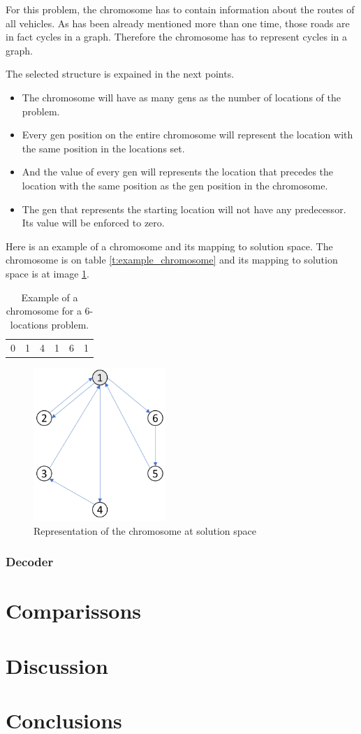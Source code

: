 \documentclass[]{report}
\begin{document}
For this problem, the chromosome has to contain information about the routes of all vehicles. As has been already mentioned more than one time, those roads are in fact cycles in a graph. Therefore the chromosome has to represent cycles in a graph. 

The selected structure is expained in the next points.
\begin{itemize}
	\item The chromosome will have as many gens as the number of locations of the problem.
	\item Every gen position on the entire chromosome will represent the location with the same position in the locations set.
	\item And the value of every gen will represents the location that precedes the location with the same position as the gen position in the chromosome.
	\item The gen that represents the starting location will not have any predecessor. Its value will be enforced to zero.
\end{itemize}

Here is an example of a chromosome and its mapping to solution space. The chromosome is on table \ref{t:example_chromosome} and its mapping to solution space is at image \ref{img:chromosome_representation}.

\begin{table}[H]
	\centering
	\caption{Example of a chromosome for a 6-locations problem.}
	\label{t:example_chromosome}
	\label{my-label}
	\begin{tabular}{@{}| c | c | c | c | c | c |@{}}
		0 & 1 & 4 & 1 & 6 & 1 \\
	\end{tabular}
\end{table}

\begin{figure}[h]
	\centering
	\includegraphics[width=50mm]{imgs/example_chromosome_decode.png}
	\caption{Representation of the chromosome at solution space}
	\label{img:chromosome_representation}
\end{figure}

\subsection{Decoder}

\chapter{Comparissons}\label{ch:comparisson}

\chapter{Discussion}\label{ch:discussion}

\chapter{Conclusions}\label{ch:conclusions}
\end{document}
